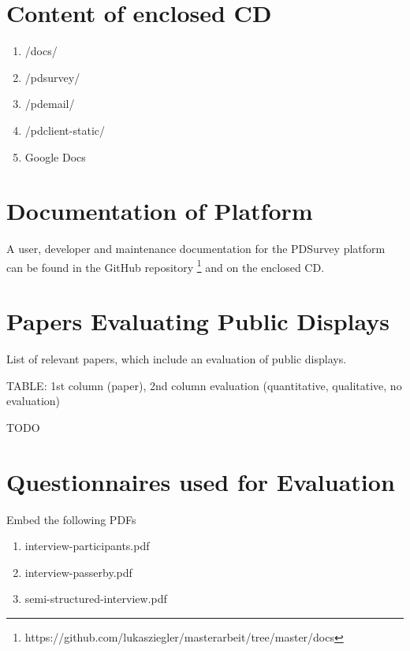 \section{Content of enclosed CD}
\label{appendix:cd-contents}


    \begin{enumerate}
    \item /docs/
    \item /pdsurvey/
    \item /pdemail/
    \item /pdclient-static/
    \item Google Docs
    \end{enumerate}




\section{Documentation of Platform}
\label{appendix:documentation}

  A user, developer and maintenance documentation for the PDSurvey platform can be found in the GitHub repository \footnote{https://github.com/lukasziegler/masterarbeit/tree/master/docs} and on the enclosed CD.




\section{Papers Evaluating Public Displays}
  
  List of relevant papers, which include an evaluation of public displays.

  TABLE: 1st column (paper), 2nd column evaluation (quantitative, qualitative, no evaluation)

  TODO




\section{Questionnaires used for Evaluation}
\label{appendix:papers}

  Embed the following PDFs

  \begin{enumerate}
  \item interview-participants.pdf \label{appendix:interview-participant}
  \item interview-passerby.pdf \label{appendix:interview-passerby}
  \item semi-structured-interview.pdf \label{appendix:semi-structured-interview}
  \end{enumerate}



